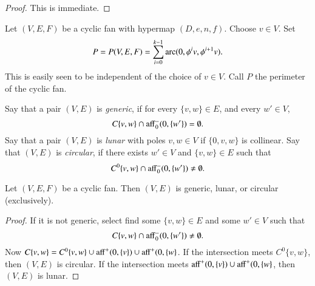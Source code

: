 \begin{proof}  This is immediate.
\end{proof}

\begin{definition}[perimeter]\label{lemma:mono}
Let $(V,E,F)$ be a cyclic fan with hypermap $(D,e,n,f)$.  Choose $v\in V$.  Set
$$
P=P(V,E,F) = \sum_{i=0}^{k-1} \operatorname{arc}(0,\phi^i v,\phi^{i+1} v).
$$
This is easily seen to be independent of the choice of $v\in V$.  Call $P$ the perimeter of the cyclic fan.
\end{definition}


\begin{definition}
Say that a pair $(V,E)$ is {\it generic}, if for every $\{v,w\}\in E$,
and every $w'\in V$, 
$$
C\{v,w\}\cap {\operatorname{aff}}_0^-(0,\{w'\}) = \emptyset.
$$
Say that a pair $(V,E)$ is {\it lunar} with poles $v,w\in V$ if $\{0,v,w\}$ is collinear.
Say that $(V,E)$ is {\it circular}, if there exists $w'\in V$ and $\{v,w\}\in E$ such that 
$$
C^0\{v,w\}\cap {\operatorname{aff}}_0^-(0,\{w'\})\ne \emptyset.
$$
\end{definition}

\begin{lemma} Let $(V,E,F)$ be a cyclic fan.  Then $(V,E)$ is
generic, lunar, or circular (exclusively).
\end{lemma}

\begin{proof} If it is not generic,  select find some $\{v,w\}\in E$
and some $w'\in V$ such that
$$
C\{v,w\}\cap {\operatorname{aff}}_0^-(0,\{w'\}) \ne \emptyset.
$$
Now $C\{v,w\} = C^0\{v,w\} \cup{\operatorname{aff}}^+(0,\{v\})\cup{\operatorname{aff}}^+(0,\{w\}$.  
If the intersection meets $C^0\{v,w\}$, then $(V,E)$ is circular.  
If the intersection meets ${\operatorname{aff}}^+(0,\{v\})\cup{\operatorname{aff}}^+(0,\{w\}$,
then $(V,E)$ is lunar. 
\end{proof}

